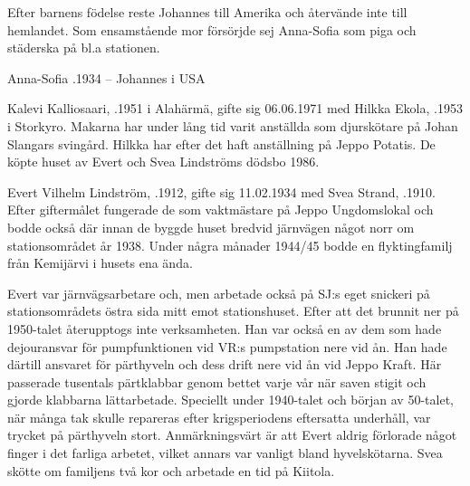 Efter barnens födelse reste Johannes till Amerika och återvände inte till hemlandet. Som ensamstående mor försörjde sej Anna-Sofia som piga och städerska på bl.a stationen.
\begin{jhchildren}
  \item {}
  \item {}
  \item {}
\end{jhchildren}

Anna-Sofia .1934  --  Johannes   i USA




Kalevi Kalliosaari, .1951 i Alahärmä, gifte sig 06.06.1971 med Hilkka Ekola, .1953 i Storkyro. Makarna har under lång tid varit anställda som djurskötare på Johan Slangars svingård. Hilkka har efter det haft anställning på Jeppo Potatis. De köpte huset av Evert och Svea Lindströms dödsbo 1986.
\begin{jhchildren}
  \item {}
  \item {}
  \item {}
\end{jhchildren}




Evert Vilhelm Lindström, .1912, gifte sig 11.02.1934 med Svea Strand, .1910. Efter giftermålet fungerade de som vaktmästare på Jeppo Ungdomslokal och bodde också där innan de byggde huset bredvid järnvägen något norr om stationsområdet år 1938. Under några månader 1944/45 bodde en flyktingfamilj från Kemijärvi i husets ena ända.

Evert var järnvägsarbetare och, men arbetade också på SJ:s eget snickeri på stationsområdets östra sida mitt emot stationshuset. Efter att det brunnit ner på 1950-talet återupptogs inte verksamheten. Han var också en av dem som hade dejouransvar för pumpfunktionen vid VR:s pumpstation nere vid ån. Han hade därtill ansvaret för pärthyveln och dess drift nere vid ån vid Jeppo Kraft. Här passerade tusentals pärtklabbar genom bettet varje vår när saven stigit och gjorde klabbarna lättarbetade. Speciellt under 1940-talet och början av 50-talet, när många tak skulle repareras efter krigsperiodens eftersatta underhåll, var trycket på pärthyveln stort. Anmärkningsvärt är att Evert aldrig förlorade något finger i det farliga arbetet, vilket annars var vanligt bland hyvelskötarna. Svea skötte om familjens två kor och  arbetade en tid på Kiitola.
\begin{jhchildren}
  \item {}
  \item {}
\end{jhchildren}


